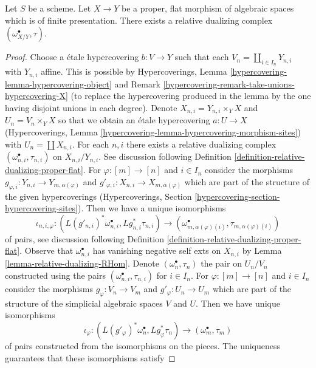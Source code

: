 \begin{lemma}
\label{lemma-existence-relative-dualizing}
Let $S$ be a scheme. Let $X \to Y$ be a proper, flat morphism of
algebraic spaces which is of finite presentation.
There exists a relative dualizing complex $(\omega_{X/Y}^\bullet, \tau)$.
\end{lemma}

\begin{proof}
Choose a \'etale hypercovering $b : V \to Y$ such that each
$V_n = \coprod_{i \in I_n} Y_{n, i}$ with $Y_{n, i}$ affine.
This is possible by Hypercoverings, Lemma
\ref{hypercovering-lemma-hypercovering-object} and
Remark \ref{hypercovering-remark-take-unions-hypercovering-X}
(to replace the hypercovering produced
in the lemma by the one having disjoint unions in each degree).
Denote $X_{n, i} = Y_{n, i} \times_Y X$ and $U_n = V_n \times_Y X$
so that we obtain an \'etale hypercovering
$a : U \to X$ (Hypercoverings, Lemma
\ref{hypercovering-lemma-hypercovering-morphism-sites})
with $U_n = \coprod X_{n, i}$.
For each $n, i$ there exists a relative dualizing complex
$(\omega_{n, i}^\bullet, \tau_{n, i})$ on $X_{n, i}/Y_{n, i}$.
See discussion following
Definition \ref{definition-relative-dualizing-proper-flat}.
For $\varphi : [m] \to [n]$ and $i \in I_n$ consider the morphisms
$g_{\varphi, i} : Y_{n, i} \to Y_{m, \alpha(\varphi)}$ and
$g'_{\varphi, i} : X_{n, i} \to X_{m, \alpha(\varphi)}$
which are part of the structure of the given hypercoverings
(Hypercoverings, Section \ref{hypercovering-section-hypercovering-sites}).
Then we have a unique isomorphisms
$$
\iota_{n, i, \varphi} :
(L(g'_{n, i})^*\omega_{n, i}^\bullet, Lg_{n, i}^*\tau_{n, i})
\longrightarrow
(\omega_{m, \alpha(\varphi)(i)}^\bullet, \tau_{m, \alpha(\varphi)(i)})
$$
of pairs, see discussion following
Definition \ref{definition-relative-dualizing-proper-flat}.
Observe that $\omega_{n, i}^\bullet$ has vanishing negative
self exts on $X_{n, i}$ by Lemma \ref{lemma-relative-dualizing-RHom}.
Denote $(\omega_n^\bullet, \tau_n)$ the pair on $U_n/V_n$ constructed using
the pairs $(\omega_{n, i}^\bullet, \tau_{n, i})$ for $i \in I_n$.
For $\varphi : [m] \to [n]$ and $i \in I_n$ consider the morphisms
$g_\varphi : V_n \to V_m$ and $g'_\varphi : U_n \to U_m$ which are part
of the structure of the simplicial algebraic spaces $V$ and $U$.
Then we have unique isomorphisms
$$
\iota_\varphi :
(L(g'_\varphi)^*\omega_n^\bullet, Lg_\varphi^*\tau_n)
\longrightarrow
(\omega_m^\bullet, \tau_m)
$$
of pairs constructed from the isomorphisms on the pieces.
The uniqueness guarantees that these isomorphisms satisfy

\end{proof}
